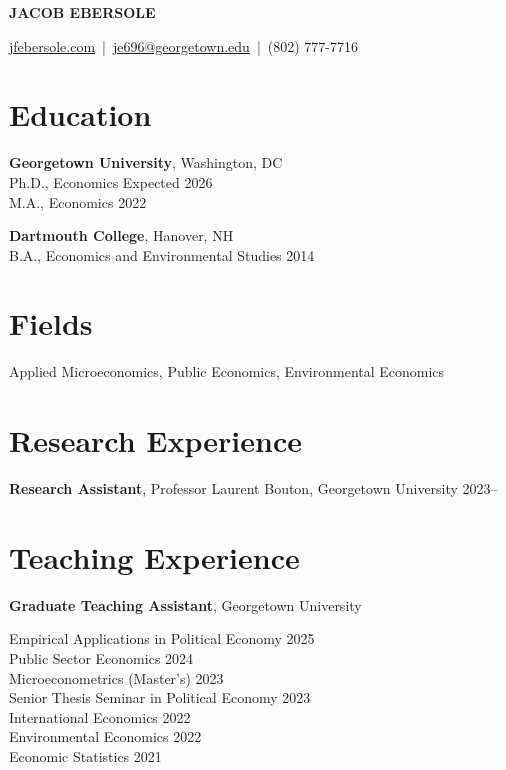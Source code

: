\documentclass[11pt]{article}
\newcommand{\header}[2]{
    \begin{center}
        {\LARGE \textbf{#1}} \\
        \vspace{10pt}
        #2
    \end{center}
}
\begin{document}
\header{JACOB EBERSOLE}{
  \href{https://jfebersole.com}{jfebersole.com} \,|\, \href{mailto:je696@georgetown.edu}{je696@georgetown.edu}  \,|\, (802) 777-7716
}


\section*{Education}

\textbf{Georgetown University}, Washington, DC \\
Ph.D., Economics \hfill Expected 2026 \\
M.A., Economics \hfill 2022

\textbf{Dartmouth College}, Hanover, NH \\
B.A., Economics and Environmental Studies \hfill 2014

\section*{Fields}
Applied Microeconomics, Public Economics, Environmental Economics
\section*{Research Experience}

\textbf{Research Assistant}, Professor Laurent Bouton, Georgetown University \hfill 2023–

\section*{Teaching Experience}

\textbf{Graduate Teaching Assistant}, Georgetown University


Empirical Applications in Political Economy \hfill 2025 \\
Public Sector Economics \hfill 2024 \\
Microeconometrics (Master's) \hfill 2023 \\
Senior Thesis Seminar in Political Economy \hfill 2023 \\
International Economics \hfill 2022 \\
Environmental Economics \hfill 2022 \\
Economic Statistics \hfill 2021
\end{document}
